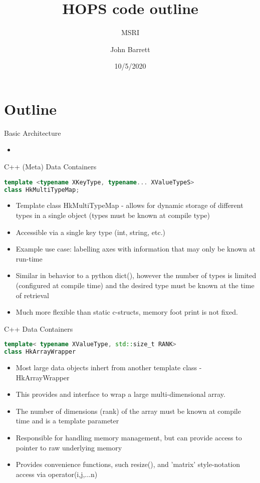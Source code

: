 \documentclass[xcolor=svgnames]{beamer}
\title[MSRI HOPS]{HOPS code outline}
\subtitle[]{MSRI}
\author[J. Barrett ]{John Barrett}
\institute[MIT]{Massachusetts Institute of Technology}
\date[10/5/2020]{10/5/2020}
\begin{document}
\section{Outline}

\begin{frame}{Basic Architecture}

\begin{itemize} 
\item 
\end{itemize}

\end{frame}

\begin{frame}[fragile]{C++ (Meta) Data Containers}

\begin{lstlisting}[language=C++,basicstyle=\ttfamily\tiny,keywordstyle=\color{red}]
template <typename XKeyType, typename... XValueTypeS>
class HkMultiTypeMap;
\end{lstlisting}

\begin{itemize}
\item Template class HkMultiTypeMap - allows for dynamic storage of different types in a single object (types must be known at compile type)
\item Accessible via a single key type (int, string, etc.)
\item Example use case: labelling axes with information that may only be known at run-time
\item Similar in behavior to a python dict(), however the number of types is limited (configured at compile time) and the desired type
must be known at the time of retrieval
\item Much more flexible than static c-structs, memory foot print is not fixed.
\end{itemize}
 
\end{frame}

\begin{frame}[fragile]{C++ Data Containers}

\begin{lstlisting}[language=C++,basicstyle=\ttfamily\tiny,keywordstyle=\color{red}]
template< typename XValueType, std::size_t RANK> 
class HkArrayWrapper
\end{lstlisting}

\begin{itemize}
\item Most large data objects inhert from another template class - HkArrayWrapper
\item This provides and interface to wrap a large multi-dimensional array.
\item The number of dimensions (rank) of the array must be known at compile time and is a template parameter
\item Responsible for handling memory management, but can provide access to pointer to raw underlying memory
\item Provides convenience functions, such resize(), and 'matrix' style-notation access via operator(i,j,...n)
\end{itemize}

\end{frame}
\end{document}
